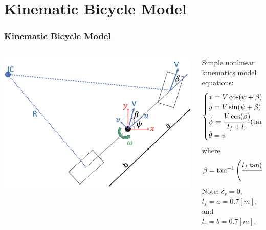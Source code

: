 \documentclass[aspectratio=169]{beamer}
\begin{document}
\section{Kinematic Bicycle Model}

\begin{frame}
	\frametitle{Kinematic Bicycle Model}

	\begin{columns}
		\begin{column}{0.4\textwidth}
			\includegraphics[width=\columnwidth]{figs/BicycleModel.png}
		\end{column}
		\begin{column}{0.5\textwidth}
			Simple nonlinear kinematics model equations:
			\begin{equation}
				\begin{cases}
					\dot{x} = V \cos(\psi + \beta)\\
					\dot{y} = V \sin(\psi + \beta)\\
					\dot{\psi} = \cfrac{V \cos(\beta)}{l_f + l_r} \qty(\tan(\delta_f) - \tan(\delta_r))\\
					\dot{\theta} = \psi
				\end{cases}
			\end{equation}
			where
			\begin{equation}
				\beta = \tan^{-1}\qty(\cfrac{l_f \tan(\delta_r) + l_r \tan(\delta_f)}{l_f + l_r})
			\end{equation}
			Note: $\delta_r = 0$, $l_f = a = 0.7 [m]$, and $l_r = b = 0.7 [m]$.
		\end{column}
	\end{columns}

\end{frame}
\end{document}
